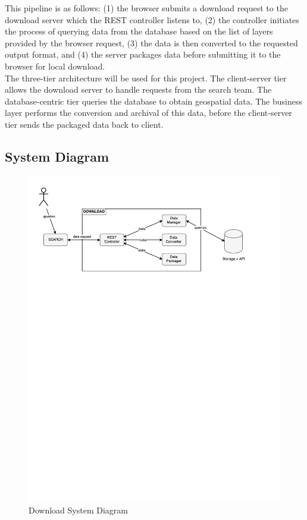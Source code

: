\documentclass{article}
\begin{document}
This pipeline is as follows: (1) the browser submits a download request to the download server which the REST controller listens to, (2) the controller initiates the process of querying data from the database based on the list of layers provided by the browser request, (3) the data is then converted to the requested output format, and (4) the server packages data before submitting it to the browser for local download. \\ 

The three-tier architecture will be used for this project. The client-server tier allows the download server to handle requests from the search team. The database-centric tier queries the database to obtain geospatial data. The business layer performs the conversion and archival of this data, before the client-server tier sends the packaged data back to client.   

\subsection{System Diagram}

\begin{figure}[H]
	\begin{center}
		\caption{Download System Diagram}
		\includegraphics[width=\textwidth]{images/component.pdf}
	\end{center}
\end{figure}
\end{document}
